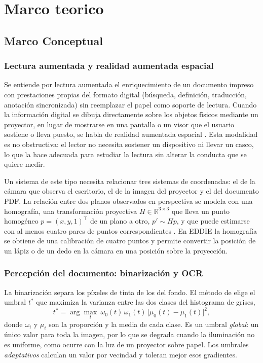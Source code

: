 \chapter{Marco teorico}
\section{Marco Conceptual}

 \subsection{Lectura aumentada y realidad aumentada espacial}

Se entiende por lectura aumentada el enriquecimiento de un documento impreso con prestaciones propias del formato digital (búsqueda, definición, traducción, anotación sincronizada) sin reemplazar el papel como soporte de lectura. Cuando la información digital se dibuja directamente sobre los objetos físicos mediante un proyector, en lugar de mostrarse en una pantalla o un visor que el usuario sostiene o lleva puesto, se habla de realidad aumentada espacial \citep{bimber2005}. Esta modalidad es no obstructiva: el lector no necesita sostener un dispositivo ni llevar un casco, lo que la hace adecuada para estudiar la lectura sin alterar la conducta que se quiere medir.

Un sistema de este tipo necesita relacionar tres sistemas de coordenadas: el de la cámara que observa el escritorio, el de la imagen del proyector y el del documento PDF. La relación entre dos planos observados en perspectiva se modela con una homografía, una transformación proyectiva $H \in \mathbb{R}^{3\times3}$ que lleva un punto homogéneo $p=(x,y,1)^\top$ de un plano a otro, $p' \sim Hp$, y que puede estimarse con al menos cuatro pares de puntos correspondientes \citep{hartley2004}. En EDDIE la homografía se obtiene de una calibración de cuatro puntos y permite convertir la posición de un lápiz o de un dedo en la cámara en una posición sobre la proyección.

\subsection{Percepción del documento: binarización y OCR}

La binarización separa los píxeles de tinta de los del fondo. El método de \citet{otsu1979} elige el umbral $t^\ast$ que maximiza la varianza entre las dos clases del histograma de grises,
\begin{equation}
t^\ast=\arg\max_{t}\ \omega_0(t)\,\omega_1(t)\,\bigl[\mu_0(t)-\mu_1(t)\bigr]^2,
\end{equation}
donde $\omega_i$ y $\mu_i$ son la proporción y la media de cada clase. Es un umbral \emph{global}: un único valor para toda la imagen, por lo que se degrada cuando la iluminación no es uniforme, como ocurre con la luz de un proyector sobre papel. Los umbrales \emph{adaptativos} calculan un valor por vecindad y toleran mejor esos gradientes.

